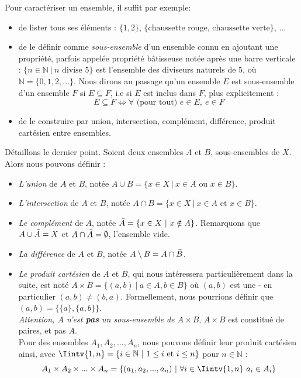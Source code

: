 \documentclass{article}
\begin{document}
\noindent Pour caractériser un ensemble, il suffit par exemple:
\begin{itemize}
    \item de lister tous ses éléments : $\{1, 2\}$, $\{\text{chaussette rouge, chaussette verte}\}$, ...
    \item de le définir comme \textit{sous-ensemble} d'un ensemble connu en ajoutant une propriété, parfois appelée propriété bâtisseuse notée après une barre verticale : $\{ n \in \mathbb{N} \ | \ n \text{ divise 5}\}$ est l'ensemble des diviseurs naturels de 5, où $\mathbb{N} = \{0, 1, 2, ...\}$. Nous dirons au passage qu'un ensemble $E$ est sous-ensemble d'un ensemble $F$ si $E \subseteq F$, i.e si $E$ est inclus dans $F$, plus explicitement :
    $$E \subseteq F \iff \forall \text{ (pour tout) } e \in E, \ e \in F$$
    
    \item de le construire par union, intersection, complément, différence, produit cartésien entre ensembles.
\end{itemize}
Détaillons le dernier point. Soient deux ensembles $A$ et $B$, sous-ensembles de $X$. Alors nous pouvons définir :
\begin{itemize}
    \item \textit{L'union} de $A$ et $B$, notée $A \cup B = \{x \in X \ | \ x \in A \text{ ou }x \in B\}$.
    \item \textit{L'intersection} de $A$ et $B$, notée $A \cap B = \{x \in X \ | \ x \in A \text{ et } x \in B\}$.
    \item \textit{Le complément} de $A$, notée $\Bar{A} = \{x \in X \ | \ x \notin A\}$. Remarquons que $A \cup \Bar{A} = X$ et $A \cap \Bar{A} = \emptyset$, l'ensemble vide.
    \item \textit{La différence} de $A$ et $B$, notée $A \setminus B = A \cap \Bar{B}$.
    \item \textit{Le produit cartésien} de $A$ et $B$, qui nous intéressera particulièrement dans la suite, est noté $A \times B = \{(a,b) \ | \ a \in A, b \in B\}$ où $(a,b)$ est une  - en particulier $(a,b) \neq (b,a)$. Formellement, nous pourrions définir que $(a,b) = \{\{a\}, \{a,b\}\}$.\\
    \textit{Attention, $A$ n'est \textbf{pas} un sous-ensemble de $A \times B$}, $A \times B$ est constitué de paires, et pas $A$.\\
    Pour des ensembles $A_1, A_2,..., A_n$, nous pouvons définir leur produit cartésien ainsi, avec $\Iintv{1, n} = \{i \in \mathbb{N} \ | \ 1 \leq i \text{ et } i \leq n\}$ pour $n \in \mathbb{N}$ : $$A_1 \times A_2 \times ... \times A_n = \{(a_1, a_2, ..., a_n) \ | \ \forall i \in \Iintv{1, n}\ a_i \in A_i\}$$
\end{itemize}
\end{document}

